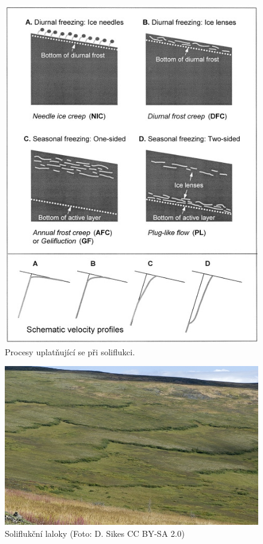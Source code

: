 \begin{figure}[h]
	\centering
	\includegraphics[width=1\linewidth]{obrazky/periglac/soliflukce}
	\caption{Procesy uplatňující se při soliflukci. \parencite{matsuokaSolifluctionRatesProcesses2001}}
	\label{fig:soliflukce}
\end{figure}


\begin{figure}[h]
	\centering
	\includegraphics[width=1\linewidth]{obrazky/periglac/soliflukcni_laloky}
	\caption{Soliflukční laloky (Foto: D. Sikes CC BY-SA 2.0)}
	\label{fig:soliflukcnilaloky}
\end{figure}

